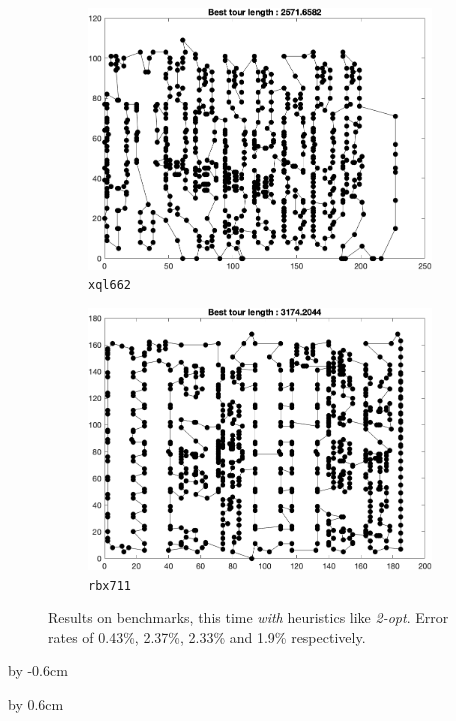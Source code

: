 \begin{figure}[H]
\begin{subfigure}[b]{0.45\textwidth}
		\includegraphics[width=\textwidth]{benchmarks/final/xql662.png}
		\caption{\texttt{xql662}}
    	\end{subfigure}
	\begin{subfigure}[b]{0.45\textwidth}
		\centering
		\includegraphics[width=\textwidth]{benchmarks/final/rbx711.png}
		\caption{\texttt{rbx711}}
    	\end{subfigure}
\caption{Results on benchmarks, this time \textit{with} heuristics like \textit{2-opt}. Error rates of 0.43\%, 2.37\%, 2.33\% and 1.9\% respectively.}
\label{fig:bench1}
\end{figure}

\newpage
\advance\voffset by -0.6cm

\advance\voffset by 0.6cm



